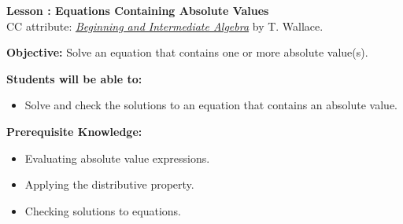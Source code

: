\documentclass[12pt]{article}
\theoremstyle{definition}
\begin{document}
{\bf \large Lesson : Equations Containing Absolute Values}
\\ CC attribute: \href{http://www.wallace.ccfaculty.org/book/book.html}{\it{Beginning and Intermediate Algebra}} by T. Wallace. 
\hfill \doclicenseImage[imagewidth=5em]\\
\par
{\bf Objective:} Solve an equation that contains one or more absolute value(s).\\
\par
{\bf Students will be able to:}
\begin{itemize}
	\item Solve and check the solutions to an equation that contains an absolute value.
\end{itemize}
{\bf Prerequisite Knowledge:}
\begin{itemize}
	\item Evaluating absolute value expressions.
	\item Applying the distributive property.
	\item Checking solutions to equations.
\end{itemize}
\hrulefill
\end{document}
